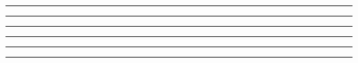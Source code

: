 \hrule height 0.05pt depth 0.05pt width 375pt
\hrule height 0.05pt depth 0.05pt width 375pt
\hrule height 0.05pt depth 0.05pt width 375pt
\hrule height 0.05pt depth 0.05pt width 375pt
\hrule height 0.05pt depth 0.05pt width 375pt
\hrule height 0.4pt depth 0.4pt width 375pt
\vfil\eject
{} \vbox{
\hglue-5dd
\vrule height 473.3pt depth 8pt width 0.8pt 
\vglue-482.3pt
\vrule height 473.3pt depth 8pt width 0.1pt 
\vglue-482.3pt
\vrule height 473.3pt depth 8pt width 0.1pt 
\vglue-482.3pt
\vrule height 473.3pt depth 8pt width 0.1pt 
\vglue-482.3pt
\vrule height 473.3pt depth 8pt width 0.1pt 
\vglue-482.3pt
\vrule height 473.3pt depth 8pt width 0.1pt 
\vglue-482.3pt
\vrule height 473.3pt depth 8pt width 0.1pt 
\vglue-482.3pt
\vrule height 473.3pt depth 8pt width 0.1pt 
\vglue-482.3pt
\vrule height 473.3pt depth 8pt width 0.1pt 
\vglue-482.3pt
\vrule height 473.3pt depth 8pt width 0.1pt 
\vglue-482.3pt
\hglue-0.4pt
\vrule height 473.3pt depth 8pt width 0.8pt 
\vglue-482.3pt
\vrule height 473.3pt depth 8pt width 0.1pt 
\vglue-482.3pt
\vrule height 473.3pt depth 8pt width 0.1pt 
\vglue-482.3pt
\vrule height 473.3pt depth 8pt width 0.1pt 
\vglue-482.3pt
\vrule height 473.3pt depth 8pt width 0.1pt 
\vglue-482.3pt
\vrule height 473.3pt depth 8pt width 0.1pt 
\vglue-482.3pt
\vrule height 473.3pt depth 8pt width 0.1pt 
\vglue-482.3pt
\vrule height 473.3pt depth 8pt width 0.1pt 
\vglue-482.3pt
\vrule height 473.3pt depth 8pt width 0.1pt 
\vglue-482.3pt
\vrule height 473.3pt depth 8pt width 0.1pt 
\vglue-482.3pt
\hglue-0.4pt
\vrule height 473.3pt depth 8pt width 0.8pt 
\vglue-482.3pt
\vrule height 473.3pt depth 8pt width 0.1pt 
\vglue-482.3pt
\vrule height 473.3pt depth 8pt width 0.1pt 
\vglue-482.3pt
\vrule height 473.3pt depth 8pt width 0.1pt 
\vglue-482.3pt
\vrule height 473.3pt depth 8pt width 0.1pt 
\vglue-482.3pt
\vrule height 473.3pt depth 8pt width 0.1pt 
\vglue-482.3pt
\vrule height 473.3pt depth 8pt width 0.1pt 
\vglue-482.3pt
\vrule height 473.3pt depth 8pt width 0.1pt 
\vglue-482.3pt
\vrule height 473.3pt depth 8pt width 0.1pt 
\vglue-482.3pt
\vrule height 473.3pt depth 8pt width 0.1pt 
\vglue-482.3pt
\hglue-0.4pt
\vrule height 473.3pt depth 8pt width 0.8pt 
}
